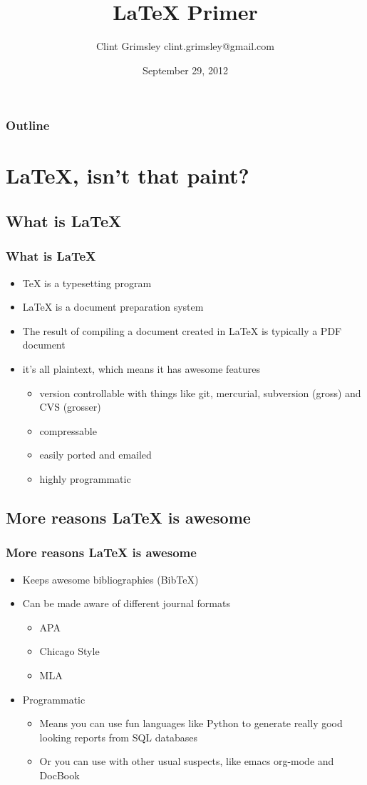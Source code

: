 \documentclass{beamer}
\title{LaTeX Primer}
\author{Clint Grimsley clint.grimsley@gmail.com}
\date{September 29, 2012}
\begin{document}
\begin{frame}
\titlepage
\end{frame}

\begin{frame}
  \frametitle{Outline}
    \tableofcontents
\end{frame}

\section{LaTeX, isn't that paint?}
\subsection{What is LaTeX}

\begin{frame}
\frametitle{What is LaTeX}
\begin{itemize}
  \item TeX is a typesetting program
  \item LaTeX is a document preparation system
  \item The result of compiling a document created in LaTeX is typically a PDF document
  \item it's all plaintext, which means it has awesome features
    \begin{itemize}
      \item version controllable with things like git, mercurial, subversion (gross) and CVS (grosser)
      \item compressable
      \item easily ported and emailed
      \item highly programmatic
    \end{itemize}
\end{itemize}
\end{frame}

\subsection{More reasons LaTeX is awesome}
\begin{frame}
  \frametitle{More reasons LaTeX is awesome}
  \begin{itemize}
    \item Keeps awesome bibliographies (BibTeX)
    \item Can be made aware of different journal formats
      \begin{itemize}
        \item APA
        \item Chicago Style
        \item MLA
      \end{itemize}
    \item Programmatic
      \begin{itemize}
        \item Means you can use fun languages like Python to generate really good looking reports from SQL databases
        \item Or you can use with other usual suspects, like emacs org-mode and DocBook
      \end{itemize}
  \end{itemize}
\end{frame}
\end{document}
